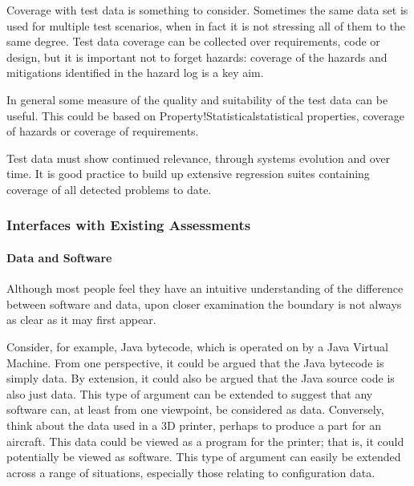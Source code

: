 Coverage with test data is something to consider. Sometimes the same data set is used for multiple test scenarios, when in fact it is not stressing all of them to the same degree. Test data coverage can be collected over requirements, code or design, but it is important not to forget hazards: coverage of the hazards and mitigations identified in the hazard log is a key aim. 

In general some measure of the quality and suitability of the test data can be useful. This could be based on {Property!Statistical}statistical properties, coverage of hazards or coverage of requirements. 

Test data must show continued relevance, through systems evolution and over time. It is good practice to build up extensive regression suites containing coverage of all detected problems to date.

\subsubsection{Interfaces with Existing Assessments}
\paragraph{Data and Software}
Although most people feel they have an intuitive understanding of the difference between software and data, upon closer examination the boundary is not always as clear as it may first appear.

Consider, for example, Java bytecode, which is operated on by a Java Virtual Machine. From one perspective, it could be argued that the Java bytecode is simply data. By extension, it could also be argued that the Java source code is also just data. This type of argument can be extended to suggest that any software can, at least from one viewpoint, be considered as data. Conversely, think about the data used in a 3D printer, perhaps to produce a part for an aircraft. This data could be viewed as a program for the printer; that is, it could potentially be viewed as software. This type of argument can easily be extended across a range of situations, especially those relating to \gls{configuration data}.

